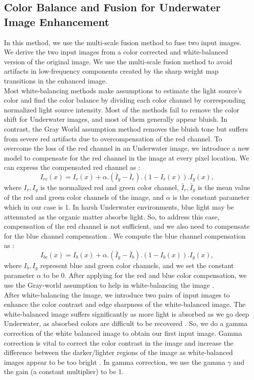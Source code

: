 \documentclass[a4paper,11pt,oneside]{article}
\begin{document}
\subsection{Color Balance and Fusion for Underwater Image Enhancement \cite{16}}
In this method, we use the multi-scale fusion method to fuse two input images. We derive the two input images from a color corrected and white-balanced version of the original image. We use the multi-scale fusion method to avoid artifacts in low-frequency components created by the sharp weight map transitions in the enhanced image.\cite{16}\\
Most white-balancing methods make assumptions to estimate the light source's color and find the color balance by dividing each color channel by corresponding normalized light source intensity.  Most of the methods fail to remove the color shift for Underwater images, and most of them generally appear bluish. In contrast, the Gray World assumption method removes the bluish tone but suffers from severe red artifacts due to overcompensation of the red channel. To overcome the loss of the red channel in an Underwater image, we introduce a new model to compensate for the red channel in the image at every pixel location. \cite{16} We can express the compensated red channel as \cite{16}:
$${I}_{rc}(x)={I}_{r}(x)+ \alpha . (\bar {I}_{g}-\bar {I}_{r}). (1 - {I}_{r}(x)) . {I}_{g}(x),$$
where $I_{r}, I_{g}$ is the normalized red and green color channel, $\bar {I}_{r},\bar {I}_{g}$ is the mean value of the red and green color channels of the image, and $\alpha$ is the constant parameter which in our case is 1. In harsh Underwater environments, blue light may be attenuated as the organic matter absorbs light. So, to address this case, compensation of the red channel is not sufficient, and we also need to compensate for the blue channel compensation \cite{16}. We compute the blue channel compensation as \cite{16}:
 $${I}_{bc}(x)={I}_{b}(x)+ \alpha . (\bar {I}_{g}-\bar {I}_{b}). (1 - {I}_{b}(x)) . {I}_{g}(x),$$
 where $I_{b}, I_{g}$ represent blue and green color channels, and we set the constant parameter $\alpha$ to be 0. After applying for the red and blue color compensation, we use the Gray-world assumption to help in white-balancing the image \cite{16}.\\
  After white-balancing the image, we introduce two pairs of input images to enhance the color contrast and edge sharpness of the white-balanced image. The white-balanced image suffers significantly as more light is absorbed as we go deep Underwater, as absorbed colors are difficult to be recovered \cite{16}. So, we do a gamma correction of the white balanced image to obtain our first input image. Gamma correction is vital to correct the color contrast in the image and increase the difference between the darker/lighter regions of the image as white-balanced images appear to be too bright \cite{16}. In gamma correction, we use the gamma $\gamma$ and the gain (a constant multiplier) to be 1.\\
\end{document}
